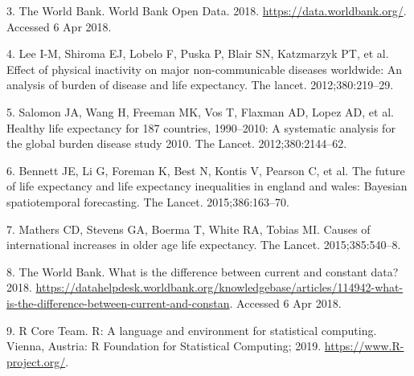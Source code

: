 \documentclass[]{elsarticle} %
\begin{document}
\leavevmode\hypertarget{ref-worldbank}{}%
3. The World Bank. World Bank Open Data. 2018. \url{https://data.worldbank.org/}. Accessed 6 Apr 2018.

\leavevmode\hypertarget{ref-lee2012effect}{}%
4. Lee I-M, Shiroma EJ, Lobelo F, Puska P, Blair SN, Katzmarzyk PT, et al. Effect of physical inactivity on major non-communicable diseases worldwide: An analysis of burden of disease and life expectancy. The lancet. 2012;380:219--29.

\leavevmode\hypertarget{ref-salomon2012healthy}{}%
5. Salomon JA, Wang H, Freeman MK, Vos T, Flaxman AD, Lopez AD, et al. Healthy life expectancy for 187 countries, 1990--2010: A systematic analysis for the global burden disease study 2010. The Lancet. 2012;380:2144--62.

\leavevmode\hypertarget{ref-bennett2015future}{}%
6. Bennett JE, Li G, Foreman K, Best N, Kontis V, Pearson C, et al. The future of life expectancy and life expectancy inequalities in england and wales: Bayesian spatiotemporal forecasting. The Lancet. 2015;386:163--70.

\leavevmode\hypertarget{ref-mathers2015causes}{}%
7. Mathers CD, Stevens GA, Boerma T, White RA, Tobias MI. Causes of international increases in older age life expectancy. The Lancet. 2015;385:540--8.

\leavevmode\hypertarget{ref-worldbankconstant}{}%
8. The World Bank. What is the difference between current and constant data? 2018. \url{https://datahelpdesk.worldbank.org/knowledgebase/articles/114942-what-is-the-difference-between-current-and-constan}. Accessed 6 Apr 2018.

\leavevmode\hypertarget{ref-R353}{}%
9. R Core Team. R: A language and environment for statistical computing. Vienna, Austria: R Foundation for Statistical Computing; 2019. \url{https://www.R-project.org/}.
\end{document}
